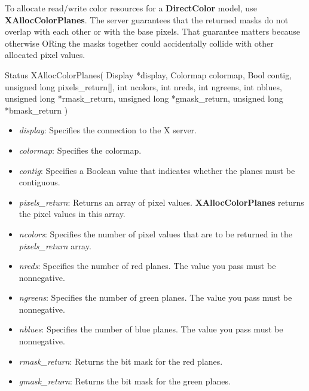 \documentclass{report}
\begin{document}
\begin{itemize}
            \bigbreak \noindent
            To allocate read/write color resources for a \textbf{DirectColor} model, use \textbf{XAllocColorPlanes}.
            \bigbreak \noindent 
            The server guarantees that the returned masks do not overlap with each other or with the base pixels. That guarantee matters because otherwise ORing the masks together could accidentally collide with other allocated pixel values.
            \bigbreak \noindent 
            \begin{cppcode}
                Status XAllocColorPlanes(
                    Display *display,
                    Colormap colormap,
                    Bool contig,
                    unsigned long pixels_return[],
                    int ncolors,
                    int nreds,
                    int ngreens,
                    int nblues,
                    unsigned long *rmask_return,
                    unsigned long *gmask_return,
                    unsigned long *bmask_return
                )
            \end{cppcode}
            \bigbreak \noindent
            \begin{itemize}
                \item \textit{display}: Specifies the connection to the X server.
                \item \textit{colormap}: Specifies the colormap.
                \item \textit{contig}: Specifies a Boolean value that indicates whether the planes must be contiguous.
                \item \textit{pixels\_return}: Returns an array of pixel values. \textbf{XAllocColorPlanes} returns the pixel values in this array.
                \item \textit{ncolors}: Specifies the number of pixel values that are to be returned in the \textit{pixels\_return} array.
                \item \textit{nreds}: Specifies the number of red planes. The value you pass must be nonnegative.
                \item \textit{ngreens}: Specifies the number of green planes. The value you pass must be nonnegative.
                \item \textit{nblues}: Specifies the number of blue planes. The value you pass must be nonnegative.
                \item \textit{rmask\_return}: Returns the bit mask for the red planes.
                \item \textit{gmask\_return}: Returns the bit mask for the green planes.

\end{itemize}
\end{itemize}
\end{document}
